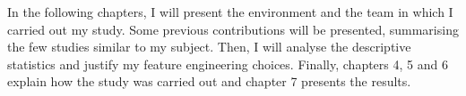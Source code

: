 \documentclass[12pt]{article}
\begin{document}


In the following chapters, I will present the environment and the team in which I carried out my study. Some previous contributions will be presented, summarising the few studies similar to my subject. Then, I will analyse the descriptive statistics and justify my feature engineering choices. Finally, chapters 4, 5 and 6 explain how the study was carried out and chapter 7 presents the results.








\newpage
\end{document}

